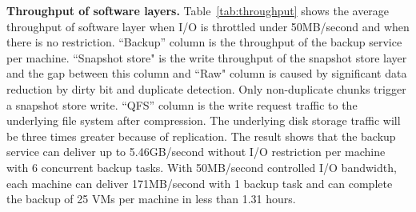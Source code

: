 {\bf Throughput of software layers.}
Table~\ref{tab:throughput} shows the  average throughput of software layer
when I/O is throttled under 50MB/second and when there is no restriction.
``Backup'' column is the throughput  of the backup service  per machine.
``Snapshot store" is the  write throughput of the snapshot store layer and the gap between this
column and  ``Raw" column is caused by significant data reduction by dirty bit and duplicate
detection. Only non-duplicate chunks trigger a snapshot store write.
``QFS'' column is the write request traffic to the underlying file system after compression.
The underlying disk storage traffic will be three times greater because of replication.
The result shows that the backup service can deliver up to 5.46GB/second without I/O restriction
per machine with 6 concurrent backup tasks. With 50MB/second controlled I/O bandwidth, each machine can deliver 171MB/second with 1 backup task and can complete the backup of 25 VMs per machine in less than 1.31 hours.
 



